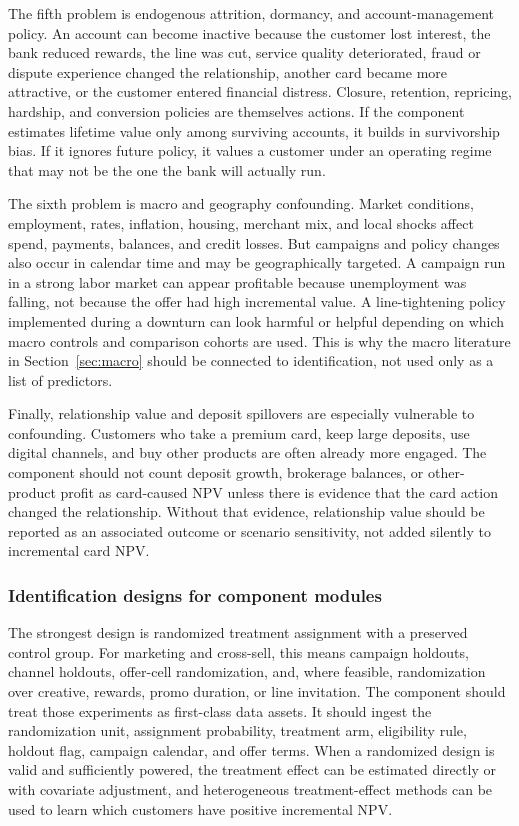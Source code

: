 \documentclass[11pt]{article}
\newcommand{\1}{\mathbf{1}}
\begin{document}
The fifth problem is endogenous attrition, dormancy, and account-management
policy. An account can become inactive because the customer lost interest, the
bank reduced rewards, the line was cut, service quality deteriorated, fraud or
dispute experience changed the relationship, another card became more
attractive, or the customer entered financial distress. Closure, retention,
repricing, hardship, and conversion policies are themselves actions. If the
component estimates lifetime value only among surviving accounts, it builds in
survivorship bias. If it ignores future policy, it values a customer under an
operating regime that may not be the one the bank will actually run.

The sixth problem is macro and geography confounding. Market conditions,
employment, rates, inflation, housing, merchant mix, and local shocks affect
spend, payments, balances, and credit losses. But campaigns and policy changes
also occur in calendar time and may be geographically targeted. A campaign run
in a strong labor market can appear profitable because unemployment was falling,
not because the offer had high incremental value. A line-tightening policy
implemented during a downturn can look harmful or helpful depending on which
macro controls and comparison cohorts are used. This is why the macro
literature in Section~\ref{sec:macro} should be connected to identification,
not used only as a list of predictors.

Finally, relationship value and deposit spillovers are especially vulnerable
to confounding. Customers who take a premium card, keep large deposits, use
digital channels, and buy other products are often already more engaged. The
component should not count deposit growth, brokerage balances, or other-product
profit as card-caused NPV unless there is evidence that the card action changed
the relationship. Without that evidence, relationship value should be reported
as an associated outcome or scenario sensitivity, not added silently to
incremental card NPV.

\subsubsection{Identification designs for component modules}

The strongest design is randomized treatment assignment with a preserved
control group. For marketing and cross-sell, this means campaign holdouts,
channel holdouts, offer-cell randomization, and, where feasible, randomization
over creative, rewards, promo duration, or line invitation. The component
should treat those experiments as first-class data assets. It should ingest the
randomization unit, assignment probability, treatment arm, eligibility rule,
holdout flag, campaign calendar, and offer terms. When a randomized design is
valid and sufficiently powered, the treatment effect can be estimated directly
or with covariate adjustment, and heterogeneous treatment-effect methods can be
used to learn which customers have positive incremental NPV.
\end{document}
